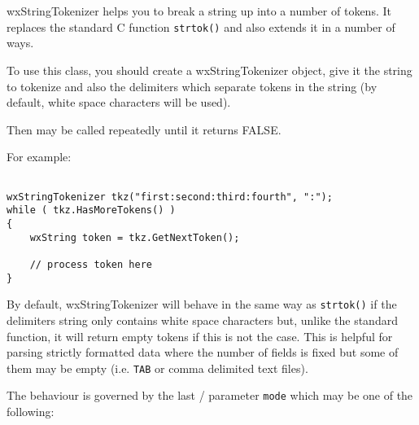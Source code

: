 \section{}\label{wxstringtokenizer}

wxStringTokenizer helps you to break a string up into a number of tokens. It
replaces the standard C function {\tt strtok()} and also extends it in a
number of ways.

To use this class, you should create a wxStringTokenizer object, give it the
string to tokenize and also the delimiters which separate tokens in the string
(by default, white space characters will be used).

Then  may be called
repeatedly until it  
returns FALSE.

For example:

\begin{verbatim}

wxStringTokenizer tkz("first:second:third:fourth", ":");
while ( tkz.HasMoreTokens() )
{
    wxString token = tkz.GetNextToken();

    // process token here
}
\end{verbatim}

By default, wxStringTokenizer will behave in the same way as {\tt strtok()} if
the delimiters string only contains white space characters but, unlike the
standard function, it will return empty tokens if this is not the case. This
is helpful for parsing strictly formatted data where the number of fields is
fixed but some of them may be empty (i.e. {\tt TAB} or comma delimited text
files).

The behaviour is governed by the last 
/ 
parameter {\tt mode} which may be one of the following:

\twocolwidtha{5cm}%
\begin{twocollist}\itemsep=0pt
\end{twocollist}

